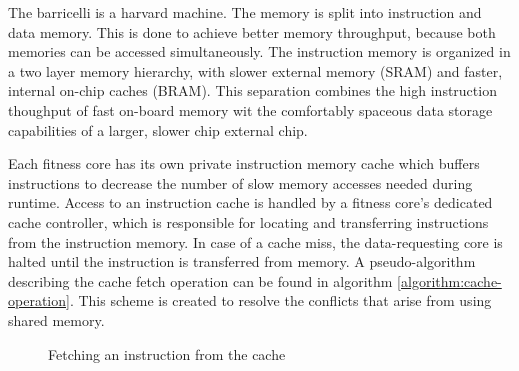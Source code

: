 The \Gls{barricelli} is a \Gls{harvard machine}.
The memory is split into instruction and data memory.
This is done to achieve better memory throughput, because both memories can be accessed simultaneously.
The instruction memory is organized in a two layer memory hierarchy, with slower external memory (\gls{SRAM}) and faster, internal on-chip caches (\gls{BRAM}).
This separation combines the high instruction thoughput of fast on-board memory wit the comfortably spaceous data storage capabilities of a larger, slower chip external chip.

Each fitness core has its own private instruction memory cache which buffers instructions to decrease the number of slow memory accesses needed during runtime.
Access to an instruction cache is handled by a fitness core's dedicated cache controller, which is responsible for locating and transferring instructions from the instruction memory.
In case of a cache miss, the data-requesting core is halted until the instruction is transferred from memory.
A pseudo-algorithm describing the cache fetch operation can be found in algorithm \vref{algorithm:cache-operation}.
This scheme is created to resolve the conflicts that arise from using shared memory. 

\begin{figure}[H]
\begin{algorithm}[H]
\SetAlgoLined
\DontPrintSemicolon
{}
\Begin{
    \If{$ a = Ca[A \bmod{512}] $}{
        \Return{$ Ci[A \bmod{512}] $}
    }\Else{
        $ Caa \bmod{512}] \longleftarrow a $\;
        $ Ci[a \bmod{512}] \longleftarrow M[a] $\;
        \Return{$ Ci[A \bmod{512}] $}
    }
}
\caption{Fetching an instruction from the cache}
\label{algorithm:cache-operation}
\end{algorithm}
\end{figure}
